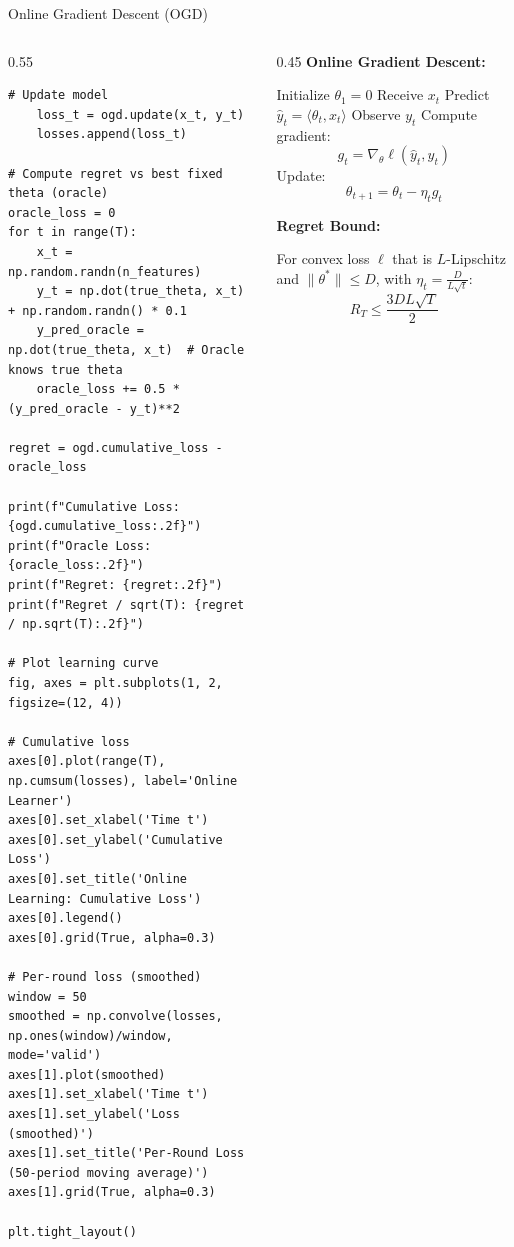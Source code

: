 \begin{frame}[fragile]{Online Gradient Descent (OGD)}
\begin{columns}
\begin{column}{0.55\textwidth}
\begin{lstlisting}[basicstyle=\ttfamily\tiny]
    # Update model
    loss_t = ogd.update(x_t, y_t)
    losses.append(loss_t)

# Compute regret vs best fixed theta (oracle)
oracle_loss = 0
for t in range(T):
    x_t = np.random.randn(n_features)
    y_t = np.dot(true_theta, x_t) + np.random.randn() * 0.1
    y_pred_oracle = np.dot(true_theta, x_t)  # Oracle knows true theta
    oracle_loss += 0.5 * (y_pred_oracle - y_t)**2

regret = ogd.cumulative_loss - oracle_loss

print(f"Cumulative Loss: {ogd.cumulative_loss:.2f}")
print(f"Oracle Loss: {oracle_loss:.2f}")
print(f"Regret: {regret:.2f}")
print(f"Regret / sqrt(T): {regret / np.sqrt(T):.2f}")

# Plot learning curve
fig, axes = plt.subplots(1, 2, figsize=(12, 4))

# Cumulative loss
axes[0].plot(range(T), np.cumsum(losses), label='Online Learner')
axes[0].set_xlabel('Time t')
axes[0].set_ylabel('Cumulative Loss')
axes[0].set_title('Online Learning: Cumulative Loss')
axes[0].legend()
axes[0].grid(True, alpha=0.3)

# Per-round loss (smoothed)
window = 50
smoothed = np.convolve(losses, np.ones(window)/window, mode='valid')
axes[1].plot(smoothed)
axes[1].set_xlabel('Time t')
axes[1].set_ylabel('Loss (smoothed)')
axes[1].set_title('Per-Round Loss (50-period moving average)')
axes[1].grid(True, alpha=0.3)

plt.tight_layout()
\end{lstlisting}
\end{column}
\begin{column}{0.45\textwidth}
\textbf{Online Gradient Descent:}

\begin{algorithm}[H]
\caption{Online Gradient Descent}
\begin{algorithmic}[1]
\STATE Initialize $\theta_1 = 0$
\STATE Receive $x_t$
\STATE Predict $\hat{y}_t = \langle \theta_t, x_t \rangle$
\STATE Observe $y_t$
\STATE Compute gradient:
\[g_t = \nabla_\theta \ell(\hat{y}_t, y_t)\]
\STATE Update:
\[\theta_{t+1} = \theta_t - \eta_t g_t\]
\ENDFOR
\end{algorithmic}
\end{algorithm}

\textbf{Regret Bound:}
\begin{theorem}
For convex loss $\ell$ that is $L$-Lipschitz and $\|\theta^*\| \leq D$, with $\eta_t = \frac{D}{L\sqrt{t}}$:
\[R_T \leq \frac{3DL\sqrt{T}}{2}\]
\end{theorem}


\end{column}
\end{columns}
\end{frame}
